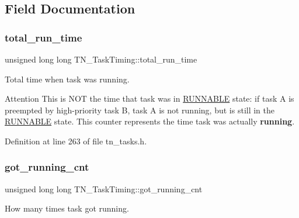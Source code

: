 \subsection{Field Documentation}
\mbox{\label{structTN__TaskTiming_a97964cfe380308698fffd730964f4d5c}} 
\subsubsection{\texorpdfstring{total\+\_\+run\+\_\+time}{total\_run\_time}}
{\footnotesize\ttfamily unsigned long long T\+N\+\_\+\+Task\+Timing\+::total\+\_\+run\+\_\+time}



Total time when task was running. 

\begin{DoxyAttention}{Attention}
This is N\+OT the time that task was in \hyperlink{tn__tasks_8h_a5e12e8a0ab280b515f44bf3fee1210a6a02783ac7808aeda318a6f506b7a276dc}{{\ttfamily R\+U\+N\+N\+A\+B\+LE}} state\+: if task A is preempted by high-\/priority task B, task A is not running, but is still in the \hyperlink{tn__tasks_8h_a5e12e8a0ab280b515f44bf3fee1210a6a02783ac7808aeda318a6f506b7a276dc}{{\ttfamily R\+U\+N\+N\+A\+B\+LE}} state. This counter represents the time task was actually {\bfseries running}. 
\end{DoxyAttention}


Definition at line 263 of file tn\+\_\+tasks.\+h.

\mbox{\label{structTN__TaskTiming_ad158c48fe2c596d914cab40c9a7838ae}} 
\subsubsection{\texorpdfstring{got\+\_\+running\+\_\+cnt}{got\_running\_cnt}}
{\footnotesize\ttfamily unsigned long long T\+N\+\_\+\+Task\+Timing\+::got\+\_\+running\+\_\+cnt}



How many times task got running. 

